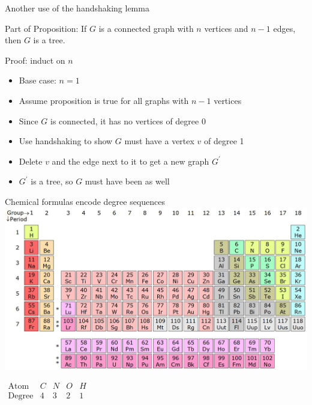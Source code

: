 \documentclass{beamer}
\begin{document}
\begin{frame}{Another use of the handshaking lemma}
  \begin{block}{Part of Proposition:}
    If $G$ is a connected graph with $n$ vertices and $n-1$ edges, then $G$ is a tree.
  \end{block}
  \begin{block}{Proof: induct on $n$}
    \begin{itemize}
    \item Base case: $n=1$
    \item Assume proposition is true for all graphs with $n-1$ vertices
    \item Since $G$ is connected, it has no vertices of degree 0
    \item Use handshaking to show $G$ must have a vertex $v$ of degree 1
    \item Delete $v$ and the edge next to it to get a new graph $G^\prime$
    \item $G^\prime$ is a tree, so $G$ must have been as well
    \end{itemize}
  \end{block}
  \end{frame}

\begin{frame}{Chemical formulas encode degree sequences}
\includegraphics[width=\textwidth]{Pictures/periodictablebig.jpg}
\begin{center} $\begin{array}{c|cccc}
  \text{Atom} & C & N & O & H \\ \hline 
  \text{Degree} & 4 & 3 & 2 & 1
  \end{array}$ \end{center}
\end{frame}
\end{document}
